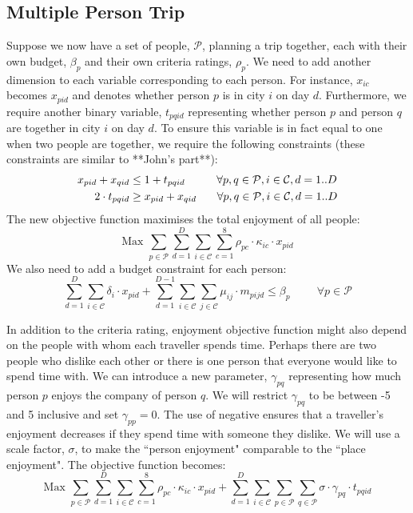 \documentclass[12pt]{article}
\begin{document}
\subsection{Multiple Person Trip}
Suppose we now have a set of people, $\mathcal{P}$, planning a trip together, each with their own budget, $\beta_{p}$ and their own criteria ratings, $\rho_{p}$. We need to add another dimension to each variable corresponding to each person. For instance, $x_{ic}$ becomes $x_{pid}$ and denotes whether person $p$ is in city $i$ on day $d$. Furthermore, we require another binary variable, $t_{pqid}$ representing whether person $p$ and person $q$ are together in city $i$ on day $d$. To ensure this variable is in fact equal to one when two people are together, we require the following constraints (these constraints are similar to **John's part**):
\begin{align*}
x_{pid} + x_{qid} &\leq 1 + t_{pqid} \hspace{1cm} \forall p,q \in \mathcal{P}, i \in \mathcal{C}, d=1..D \\
2\cdot t_{pqid} &\geq x_{pid} + x_{qid} \hspace{6.5mm} \forall p,q \in \mathcal{P}, i \in \mathcal{C}, d=1..D 
\end{align*}
The new objective function maximises the total enjoyment of all people:
\begin{equation*}
\text{Max   } \sum_{p \in \mathcal{P}} \sum_{d=1}^{D} \sum_{i \in \mathcal{C}} \sum_{c=1}^{8} \rho_{pc} \cdot \kappa_{ic} \cdot x_{pid}
\end{equation*}
We also need to add a budget constraint for each person:
\begin{equation*}
\sum_{d=1}^{D} \sum_{i \in \mathcal{C}} \delta_{i} \cdot x_{pid} + \sum_{d=1}^{D-1} \sum_{i \in \mathcal{C}} \sum_{j \in \mathcal{C}} \mu_{ij} \cdot m_{pijd} \leq \beta_{p} \hspace{1cm} \forall p \in \mathcal{P}
\end{equation*}

In addition to the criteria rating, enjoyment objective function might also depend on the people with whom each traveller spends time. Perhaps there are two people who dislike each other or there is one person that everyone would like to spend time with. We can introduce a new parameter, $\gamma_{pq}$ representing how much person $p$ enjoys the company of person $q$. We will restrict $\gamma_{pq}$ to be between -5 and 5 inclusive and set $\gamma_{pp}=0$. The use of negative ensures that a traveller's enjoyment decreases if they spend time with someone they dislike. We will use a scale factor, $\sigma$, to make the ``person enjoyment" comparable to the ``place enjoyment". The objective function becomes:
\begin{equation*}
\text{Max   } \sum_{p \in \mathcal{P}} \sum_{d=1}^{D} \sum_{i \in \mathcal{C}} \sum_{c=1}^{8} \rho_{pc} \cdot \kappa_{ic} \cdot x_{pid} + \sum_{d=1}^{D} \sum_{i \in \mathcal{C}} \sum_{p \in \mathcal{P}} \sum_{q \in \mathcal{P}} \sigma \cdot \gamma_{pq} \cdot t_{pqid}
\end{equation*}
\end{document}
